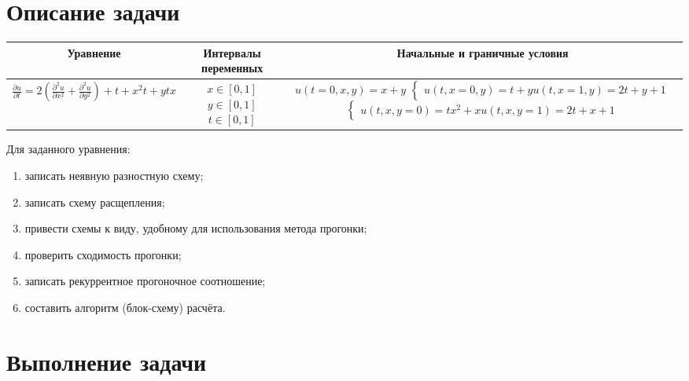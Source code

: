 \documentclass[12pt, a4paper]{report}
\begin{document}
	\section*{Описание задачи}
	\large
	\begin{center}
		\begin{tabular}{||c|c|c||}
			\hline
			Уравнение & \makecell{Интервалы \\ переменных} & Начальные и граничные условия \\

			\hline
			$ \frac{\partial u}{\partial t} = 2(\frac{\partial^{2} u}{\partial x^{2}} + \frac{\partial^{2} u}{\partial y^{2}}) + t + x^{2}t + ytx $ & \makecell{$ x \in [0, 1] $ \\ $ y \in [0, 1] $ \\ $ t \in [0, 1] $} & \makecell{$ u(t = 0, x, y) = x + y $ \\ $\begin{cases} u(t, x = 0, y) = t + y \\ u(t, x = 1, y) = 2t + y + 1 \end{cases}$ \\ $\begin{cases} u(t, x, y = 0) = tx^{2} + x \\ u(t, x, y = 1) = 2t + x + 1 \end{cases}$} \\

			\hline
		\end{tabular}
	\end{center}
	\par
	Для заданного уравнения:
	\begin{enumerate}
		\item записать неявную разностную схему;
		\item записать схему расщепления;
		\item привести схемы к виду, удобному для использования метода прогонки;
		\item проверить сходимость прогонки;
		\item записать рекуррентное прогоночное соотношение;
		\item составить алгоритм (блок-схему) расчёта.
	\end{enumerate}

	\newpage

	\section*{Выполнение задачи}
\end{document}
